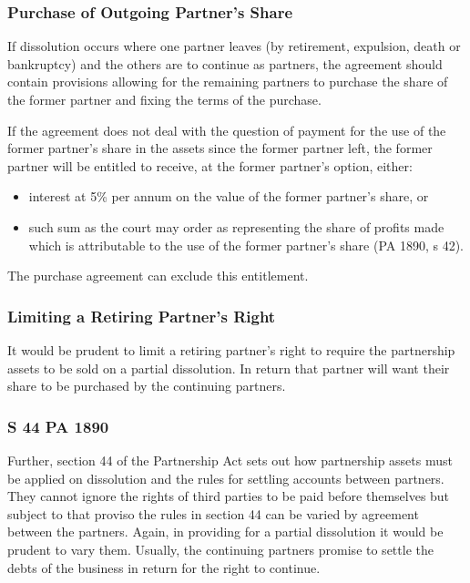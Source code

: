 \documentclass[
]{article}
\providecommand{\tightlist}{%
  \setlength{\itemsep}{0pt}\setlength{\parskip}{0pt}}
\begin{document}
\hypertarget{purchase-of-outgoing-partners-share}{%
\subsubsection{Purchase of Outgoing Partner's
Share}\label{purchase-of-outgoing-partners-share}}

If dissolution occurs where one partner leaves (by retirement,
expulsion, death or bankruptcy) and the others are to continue as
partners, the agreement should contain provisions allowing for the
remaining partners to purchase the share of the former partner and
fixing the terms of the purchase.

If the agreement does not deal with the question of payment for the use
of the former partner's share in the assets since the former partner
left, the former partner will be entitled to receive, at the former
partner's option, either:

\begin{itemize}
\tightlist
\item
  interest at 5\% per annum on the value of the former partner's share,
  or
\item
  such sum as the court may order as representing the share of profits
  made which is attributable to the use of the former partner's share
  (PA 1890, s 42).
\end{itemize}

The purchase agreement can exclude this entitlement.

\hypertarget{limiting-a-retiring-partners-right}{%
\subsubsection{Limiting a Retiring Partner's
Right}\label{limiting-a-retiring-partners-right}}

It would be prudent to limit a retiring partner's right to require the
partnership assets to be sold on a partial dissolution. In return that
partner will want their share to be purchased by the continuing
partners.

\hypertarget{s-44-pa-1890}{%
\subsubsection{S 44 PA 1890}\label{s-44-pa-1890}}

Further, section 44 of the Partnership Act sets out how partnership
assets must be applied on dissolution and the rules for settling
accounts between partners. They cannot ignore the rights of third
parties to be paid before themselves but subject to that proviso the
rules in section 44 can be varied by agreement between the partners.
Again, in providing for a partial dissolution it would be prudent to
vary them. Usually, the continuing partners promise to settle the debts
of the business in return for the right to continue.
\end{document}
